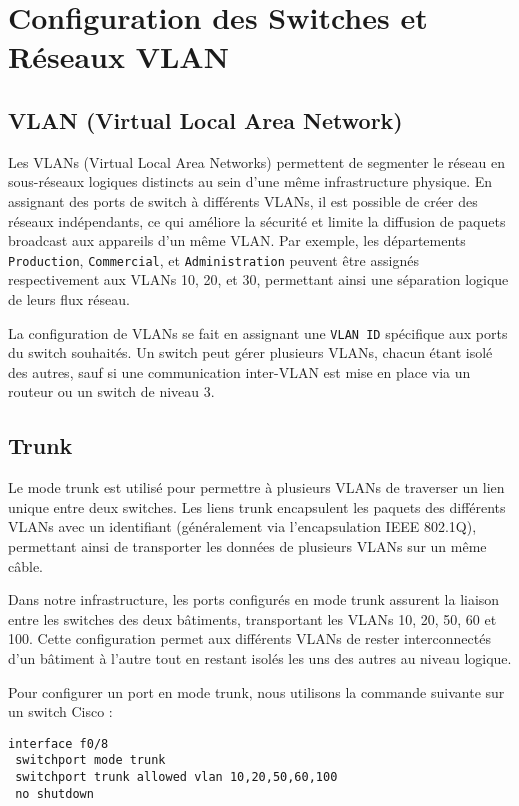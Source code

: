 \documentclass[a4paper,12pt]{report}
\begin{document}
        \section{Configuration des Switches et Réseaux VLAN}

            \subsection{VLAN (Virtual Local Area Network)}
                Les VLANs (Virtual Local Area Networks) permettent de segmenter le réseau en sous-réseaux logiques distincts au sein d'une même infrastructure physique. En assignant des ports de switch à différents VLANs, il est possible de créer des réseaux indépendants, ce qui améliore la sécurité et limite la diffusion de paquets broadcast aux appareils d'un même VLAN. Par exemple, les départements \texttt{Production}, \texttt{Commercial}, et \texttt{Administration} peuvent être assignés respectivement aux VLANs 10, 20, et 30, permettant ainsi une séparation logique de leurs flux réseau.

                La configuration de VLANs se fait en assignant une \texttt{VLAN ID} spécifique aux ports du switch souhaités. Un switch peut gérer plusieurs VLANs, chacun étant isolé des autres, sauf si une communication inter-VLAN est mise en place via un routeur ou un switch de niveau 3.

            \subsection{Trunk}
                Le mode trunk est utilisé pour permettre à plusieurs VLANs de traverser un lien unique entre deux switches. Les liens trunk encapsulent les paquets des différents VLANs avec un identifiant (généralement via l'encapsulation IEEE 802.1Q), permettant ainsi de transporter les données de plusieurs VLANs sur un même câble.

                Dans notre infrastructure, les ports configurés en mode trunk assurent la liaison entre les switches des deux bâtiments, transportant les VLANs 10, 20, 50, 60 et 100. Cette configuration permet aux différents VLANs de rester interconnectés d'un bâtiment à l'autre tout en restant isolés les uns des autres au niveau logique. 

                Pour configurer un port en mode trunk, nous utilisons la commande suivante sur un switch Cisco :

                \begin{verbatim}
interface f0/8
 switchport mode trunk
 switchport trunk allowed vlan 10,20,50,60,100
 no shutdown
                \end{verbatim}
\end{document}
